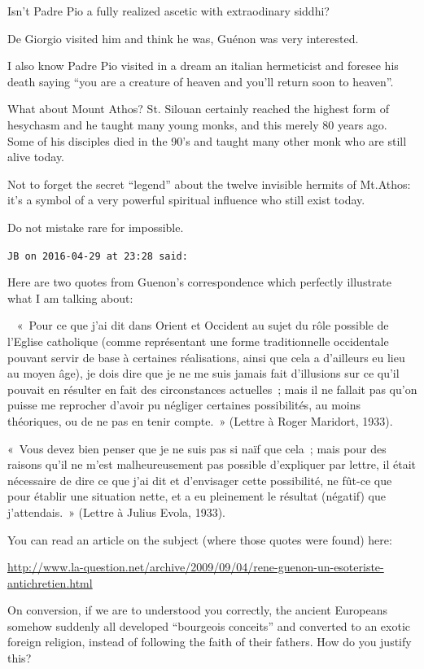 \begin{footnotesize}
\begin{sffamily}
Isn't Padre Pio a fully realized ascetic with extraodinary siddhi?

De Giorgio visited him and think he was, Guénon was very interested.

I also know Padre Pio visited in a dream an italian hermeticist and foresee his death saying ``you are a creature of heaven and you'll return soon to heaven''.

What about Mount Athos? St. Silouan certainly reached the highest form of hesychasm and he taught many young monks, and this merely 80 years ago. Some of his disciples died in the 90's and taught many other monk who are still alive today.

Not to forget the secret ``legend'' about the twelve invisible hermits of Mt.Athos: it's a symbol of a very powerful spiritual influence who still exist today.

Do not mistake rare for impossible.

\hfill

\texttt{JB on 2016-04-29 at 23:28 said:}

Here are two quotes from Guenon's correspondence which perfectly illustrate what I am talking about:

~ «~Pour ce que j'ai dit dans Orient et Occident au sujet du rôle possible de l'Eglise catholique (comme représentant une forme traditionnelle occidentale pouvant servir de base à certaines réalisations, ainsi que cela a d'ailleurs eu lieu au moyen âge), je dois dire que je ne me suis jamais fait d'illusions sur ce qu'il pouvait en résulter en fait des circonstances actuelles~; mais il ne fallait pas qu'on puisse me reprocher d'avoir pu négliger certaines possibilités, au moins théoriques, ou de ne pas en tenir compte.~» (Lettre à Roger Maridort, 1933).

«~Vous devez bien penser que je ne suis pas si naïf que cela~; mais pour des raisons qu'il ne m'est malheureusement pas possible d'expliquer par lettre, il était nécessaire de dire ce que j'ai dit et d'envisager cette possibilité, ne fût-ce que pour établir une situation nette, et a eu pleinement le résultat (négatif) que j'attendais.~» (Lettre à Julius Evola, 1933).

You can read an article on the subject (where those quotes were found) here:

\url{http://www.la-question.net/archive/2009/09/04/rene-guenon-un-esoteriste-antichretien.html}


On conversion, if we are to understood you correctly, the ancient Europeans somehow suddenly all developed ``bourgeois conceits'' and converted to an exotic foreign religion, instead of following the faith of their fathers. How do you justify this?


\end{sffamily}
\end{footnotesize}

